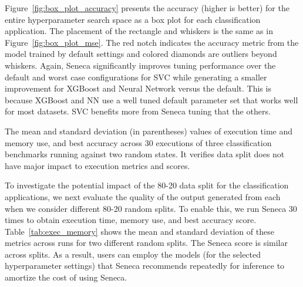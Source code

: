 Figure~\ref{fig:box_plot_accuracy} presents the accuracy (higher is better) 
for the entire hyperparameter search space as a box plot for each classification
application.  The placement of the rectangle and whiskers is the same
as in Figure~\ref{fig:box_plot_mse}. 
The red notch indicates the accuracy metric from the model trained by default settings and colored diamonds are outliers beyond whiskers.
Again, Seneca significantly
improves tuning performance over the default and worst case configurations for SVC while generating a smaller improvement for XGBoost and Neural Network versus the default.
This is because XGBoost and NN use a well tuned default parameter
set that works well for most datasets.  SVC benefits more from Seneca tuning
that the others.

\begin{table}[t]
\centering
\scriptsize

\caption{The mean and standard deviation (in parentheses) values of execution time and memory use, and best accuracy across 30 executions of three classification benchmarks running against two random states. It verifies data split does not have major impact to execution metrics and scores.
\label{tab:exec_memory}}
\end{table}

To investigate the potential impact of the 80-20 data split for the classification
applications, we next evaluate the quality of the output generated from 
each when we consider different 80-20 random splits.
To enable this, we run Seneca 30 times to obtain execution time, memory use, 
and best accuracy score. 
Table~\ref{tab:exec_memory} shows the mean and standard deviation of these 
metrics across runs for two different random splits.  The Seneca score
is similar across splits.  As a result, users can employ the models
(for the selected hyperparameter settings) that Seneca recommends
repeatedly for inference to amortize the cost of using Seneca.

% 

